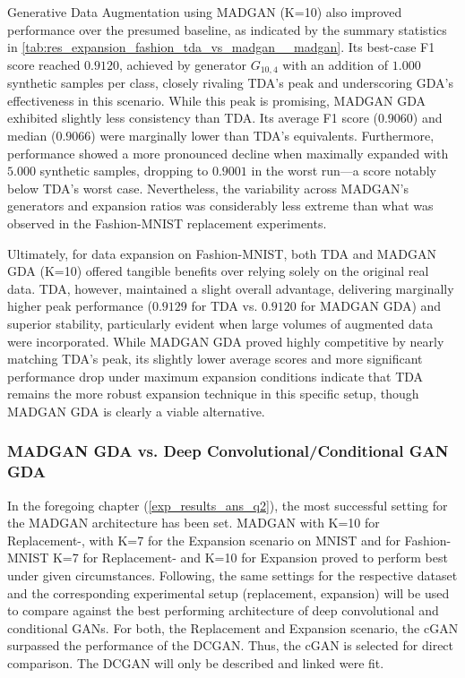 Generative Data Augmentation using MADGAN (K=10) also improved performance over the presumed baseline, as indicated by the summary statistics in \ref{tab:res_expansion_fashion_tda_vs_madgan__madgan}. Its best-case F1 score reached $0.9120$, achieved by generator \(G_{10,4}\) with an addition of $1.000$ synthetic samples per class, closely rivaling TDA's peak and underscoring GDA's effectiveness in this scenario. While this peak is promising, MADGAN GDA exhibited slightly less consistency than TDA. Its average F1 score ($0.9060$) and median ($0.9066$) were marginally lower than TDA's equivalents. Furthermore, performance showed a more pronounced decline when maximally expanded with $5.000$ synthetic samples, dropping to $0.9001$ in the worst run—a score notably below TDA's worst case. Nevertheless, the variability across MADGAN's generators and expansion ratios was considerably less extreme than what was observed in the Fashion-MNIST replacement experiments.

Ultimately, for data expansion on Fashion-MNIST, both TDA and MADGAN GDA (K=10) offered tangible benefits over relying solely on the original real data. TDA, however, maintained a slight overall advantage, delivering marginally higher peak performance ($0.9129$ for TDA vs. $0.9120$ for MADGAN GDA) and superior stability, particularly evident when large volumes of augmented data were incorporated. While MADGAN GDA proved highly competitive by nearly matching TDA's peak, its slightly lower average scores and more significant performance drop under maximum expansion conditions indicate that TDA remains the more robust expansion technique in this specific setup, though MADGAN GDA is clearly a viable alternative.


\newpage
\subsubsection[Question 3]{MADGAN GDA vs. Deep Convolutional/Conditional GAN GDA} \label{exp_results_ans_q3}
In the foregoing chapter (\ref{exp_results_ans_q2}), the most successful setting for the MADGAN architecture has been set. MADGAN with K=10 for Replacement-, with K=7 for the Expansion scenario on MNIST and for Fashion-MNIST K=7 for Replacement- and K=10 for Expansion proved to perform best under given circumstances. Following, the same settings for the respective dataset and the corresponding experimental setup (replacement, expansion) will be used to compare against the best performing architecture of deep convolutional and conditional GANs. For both, the Replacement and Expansion scenario, the cGAN surpassed the performance of the DCGAN. Thus, the cGAN is selected for direct comparison. The DCGAN will only be described and linked were fit.

